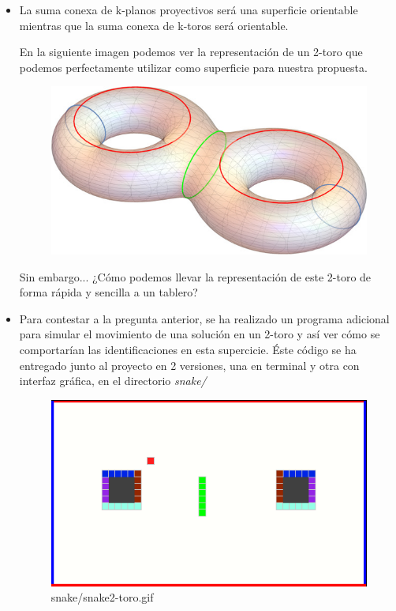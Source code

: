 \begin{itemize}
	\item La suma conexa de k-planos proyectivos será una superficie orientable mientras que la suma conexa de k-toros será orientable.
	
	En la siguiente imagen podemos ver la representación de un 2-toro que podemos perfectamente utilizar como superficie para nuestra propuesta.
	
	\begin{figure}[H]
	\centering
	\includegraphics[scale=0.35]{img/2t.png}
	\end{figure}

	Sin embargo... ¿Cómo podemos llevar la representación de este 2-toro de forma rápida y sencilla a un tablero? 


	\item Para contestar a la pregunta anterior,  se ha realizado un programa adicional para simular el movimiento de una solución en un 2-toro y así ver cómo se comportarían las identificaciones en esta supercicie. Éste código se ha entregado junto al proyecto en 2 versiones, una en terminal y otra con interfaz gráfica, en el directorio \textit{snake/}
	
	
		\begin{figure}[H]
		\centering
		\includegraphics[scale=0.45]{img/yesh.png}
		\caption{snake/snake2-toro.gif}
	\end{figure}
	

\end{itemize}




